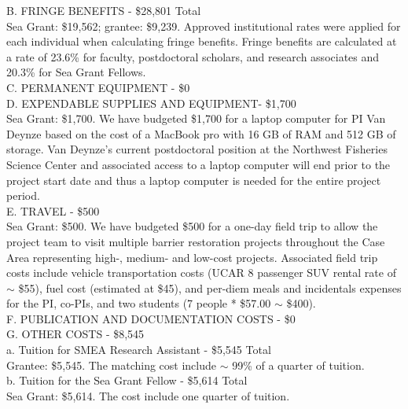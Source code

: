 \documentclass[12pt]{elsarticle}
\begin{document}
B. FRINGE BENEFITS - \$28,801 Total\\

Sea Grant: \$19,562; grantee: \$9,239. Approved institutional rates were applied for each individual when calculating fringe benefits. Fringe benefits are calculated at a rate of 23.6\% for faculty, postdoctoral scholars, and research associates and 20.3\% for Sea Grant Fellows.\\

C. PERMANENT EQUIPMENT - \$0\\

D. EXPENDABLE SUPPLIES AND EQUIPMENT- \$1,700\\
Sea Grant: \$1,700. We have budgeted \$1,700 for a laptop computer for PI Van Deynze based on the cost of a MacBook pro with 16 GB of RAM and 512 GB of storage. Van Deynze's current postdoctoral position at the Northwest Fisheries Science Center and associated access to a laptop computer will end prior to the project start date and thus a laptop computer is needed for the entire project period.\\

E. TRAVEL - \$500\\
Sea Grant: \$500. We have budgeted \$500 for a one-day field trip to allow the project team to visit multiple barrier restoration projects throughout the Case Area representing high-, medium- and low-cost projects. Associated field trip costs include vehicle transportation costs (UCAR 8 passenger SUV rental rate of $\sim$ \$55), fuel cost (estimated at \$45), and per-diem meals and incidentals expenses for the PI, co-PIs, and two students (7 people * \$57.00 $\sim$ \$400).\\

F. PUBLICATION AND DOCUMENTATION COSTS - \$0\\

G. OTHER COSTS - \$8,545\\

a. Tuition for SMEA Research Assistant - \$5,545 Total\\
Grantee: \$5,545. The matching cost include $\sim$ 99\% of a quarter of tuition.\\

b. Tuition for the Sea Grant Fellow - \$5,614 Total\\
Sea Grant: \$5,614. The cost include one quarter of tuition.\\
\end{document}
